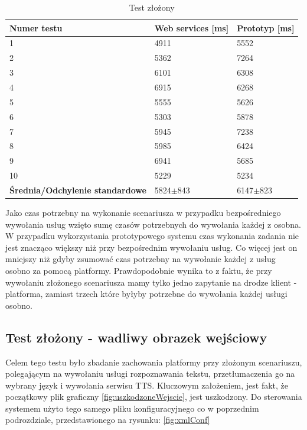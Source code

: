 \begin{center}
	\begin{table}[h]
	\caption{Test złożony}
	\label{tab:bigTest}
	\centering
	\begin{tabular}{| l | l | l |}	
		\hline
		\textbf{Numer testu} & \textbf{Web services [ms]} & \textbf{Prototyp [ms]} \\ \hline
		1 & 4911 & 5552\\ \hline
		2 & 5362 & 7264\\ \hline
		3 & 6101 & 6308\\ \hline
		4 & 6915 & 6268\\ \hline
		5 & 5555 & 5626\\ \hline
		6 & 5303 & 5878\\ \hline
		7 & 5945 & 7238\\ \hline
		8 & 5985 & 6424\\ \hline
		9 & 6941 & 5685\\ \hline
		10 & 5229 & 5234\\ \hline
		\textbf{Średnia/Odchylenie standardowe} & 5824$\pm$843 & 6147$\pm$823\\ 
		\hline
	\end{tabular}
	\end{table}
\end{center}
Jako czas potrzebny na wykonanie scenariusza w przypadku bezpośredniego wywołania usług wzięto sumę czasów potrzebnych do wywołania każdej z osobna. W przypadku wykorzystania prototypowego systemu czas wykonania zadania nie jest znacząco większy niż przy bezpośrednim wywołaniu usług. Co więcej jest on mniejszy niż gdyby zsumować czas potrzebny na wywołanie każdej z usług osobno za pomocą platformy. Prawdopodobnie wynika to z faktu, że przy wywołaniu złożonego scenariusza mamy tylko jedno zapytanie na drodze klient - platforma, zamiast trzech które byłyby potrzebne do wywołania każdej usługi osobno.  

\subsection{Test złożony - wadliwy obrazek wejściowy}
Celem tego testu było zbadanie zachowania platformy przy złożonym scenariuszu, polegającym na wywołaniu usługi rozpoznawania tekstu, przetłumaczenia go na wybrany język i wywołania serwisu TTS. Kluczowym założeniem, jest fakt, że początkowy plik graficzny \ref{fig:uszkodzoneWejscie}, jest uszkodzony. Do sterowania systemem użyto tego samego pliku konfiguracyjnego co w poprzednim podrozdziale, przedstawionego na rysunku: \ref{fig:xmlConf}

